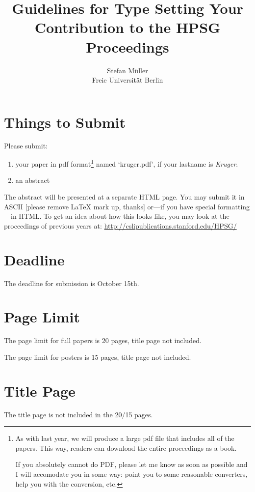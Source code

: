 \documentclass[11pt,a4paper,fleqn]{article}
\title{Guidelines for Type Setting Your Contribution to the HPSG Proceedings}
\author{Stefan Müller\\
Freie Universität Berlin}
\begin{document}
\maketitle


\section{Things to Submit}

Please submit:
\begin{enumerate}
\item your paper in pdf format\footnote{
As with last year, we will produce a large pdf file that includes all
of the papers.  This way, readers can download the entire proceedings
as a book.

If you absolutely cannot do PDF, please let me know as soon as
possible and I will accomodate you in some way: point you to some
reasonable converters, help you with the conversion, etc.}
%
 named `kruger.pdf', if your lastname is \emph{Kruger}.



\item an abstract
\end{enumerate}
The abstract will be presented at a separate HTML page. You may submit it in ASCII [please remove \LaTeX{} mark up, thanks]
or---if you have special formatting---in HTML. 
To get an idea about how this looks like,
you may look at the proceedings of previous years at:\newline
\url{http://cslipublications.stanford.edu/HPSG/}\section{Deadline}

The deadline for submission is October 15th.

\section{Page Limit}

The page limit for full papers is 20 pages, title page not included.

The page limit for posters is 15 pages, title page not included.

\section{Title Page}


The title page is not included in the 20/15 pages.
\end{document}
